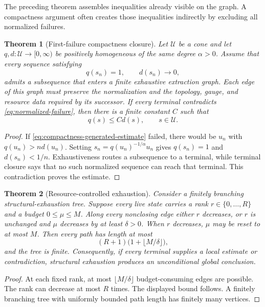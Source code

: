 \documentclass[11pt,reqno]{amsart}
\theoremstyle{plain}
\newtheorem{theorem}{Theorem}[section]
\theoremstyle{definition}
\theoremstyle{remark}
\numberwithin{equation}{section}
\newcommand{\calU}{\mathcal U}
\begin{document}
The preceding theorem assembles inequalities already visible on the graph.  A
compactness argument often creates those inequalities indirectly by excluding
all normalized failures.

\begin{theorem}[First-failure compactness closure]
\label{thm:first-failure-compactness}
Let \(\calU\) be a cone and let \(q,d:\calU\to[0,\infty)\) be positively
homogeneous of the same degree \(\alpha>0\).  Assume that every sequence satisfying
\begin{equation}\label{eq:normalized-failure}
 q(s_n)=1,
 \qquad d(s_n)\longrightarrow0,
\end{equation}
admits a subsequence that enters a finite exhaustive extraction graph.  Each
edge of this graph must preserve the normalization and the topology, gauge, and
resource data required by its successor.  If every terminal contradicts
\eqref{eq:normalized-failure}, then there is a finite constant \(C\) such that
\begin{equation}\label{eq:compactness-generated-estimate}
 q(s)\le C d(s),\qquad s\in\calU.
\end{equation}
\end{theorem}

\begin{proof}
If \eqref{eq:compactness-generated-estimate} failed, there would be \(u_n\) with
\(q(u_n)>n d(u_n)\).  Setting
\(s_n=q(u_n)^{-1/\alpha}u_n\) gives \(q(s_n)=1\) and
\(d(s_n)<1/n\).  Exhaustiveness routes a subsequence
to a terminal, while terminal closure says that no such normalized sequence can
reach that terminal.  This contradiction proves the estimate.
\end{proof}

\begin{theorem}[Resource-controlled exhaustion]
\label{thm:resource-termination}
Consider a finitely branching structural-exhaustion tree.  Suppose every live
state carries a rank \(r\in\{0,\ldots,R\}\) and a budget
\(0\le\mu\le M\).  Along every nonclosing edge either \(r\) decreases, or \(r\)
is unchanged and \(\mu\) decreases by at least \(\delta>0\).  When \(r\)
decreases, \(\mu\) may be reset to at most \(M\).  Then every path has length at
most
\[
 (R+1)\bigl(1+\lfloor M/\delta\rfloor\bigr),
\]
and the tree is finite.  Consequently, if every terminal supplies a local
estimate or contradiction, structural exhaustion produces an unconditional
global conclusion.
\end{theorem}

\begin{proof}
At each fixed rank, at most \(\lfloor M/\delta\rfloor\) budget-consuming edges
are possible.  The rank can decrease at most \(R\) times.  The displayed bound
follows.  A finitely branching tree with uniformly bounded path length has
finitely many vertices.
\end{proof}
\end{document}
